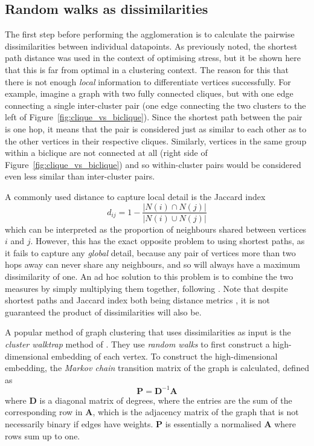 \subsection{Random walks as dissimilarities}
The first step before performing the agglomeration is to calculate the pairwise dissimilarities between individual datapoints. As previously noted, the shortest path distance was used in the context of optimising stress, but it be shown here that this is far from optimal in a clustering context.
The reason for this that there is not enough \emph{local} information to differentiate vertices successfully.
For example, imagine a graph with two fully connected cliques, but with one edge connecting a single inter-cluster pair (one edge connecting the two clusters to the left of Figure~\ref{fig:clique_vs_biclique}). Since the shortest path between the pair is one hop, it means that the pair is considered just as similar to each other as to the other vertices in their respective cliques.
Similarly, vertices in the same group within a biclique are not connected at all (right side of Figure~\ref{fig:clique_vs_biclique}) and so within-cluster pairs would be considered even less similar than inter-cluster pairs.

A commonly used distance to capture local detail is the Jaccard index
\begin{equation}
  d_{ij} = 1 - \frac{|N(i) \cap N(j)|}{|N(i) \cup N(j)|}
  \label{eq:jaccard}
\end{equation}
which can be interpreted as the proportion of neighbours shared between vertices $i$ and $j$. However, this has the exact opposite problem to using shortest paths, as it fails to capture any \emph{global} detail, because any pair of vertices more than two hops away can never share any neighbours, and so will always have a maximum dissimilarity of one.
An ad hoc solution to this problem is to combine the two measures by simply multiplying them together, following \citet{Zheng2018}. Note that despite shortest paths and Jaccard index both being distance metrics \citep{Clarkson2006}, it is not guaranteed the product of dissimilarities will also be.

A popular method of graph clustering that uses dissimilarities as input is the \emph{cluster walktrap} method of \citet{Pons2006}. They use \emph{random walks} to first construct a high-dimensional embedding of each vertex.
To construct the high-dimensional embedding, the \emph{Markov chain} transition matrix of the graph is calculated, defined as
\begin{equation}
  \mathbf{P} = \mathbf{D}^{-1} \mathbf{A}
\end{equation}
where $\mathbf{D}$ is a diagonal matrix of degrees, where the entries are the sum of the corresponding row in $\mathbf{A}$, which is the adjacency matrix of the graph that is not necessarily binary if edges have weights. $\mathbf{P}$ is essentially a normalised $\mathbf{A}$ where rows sum up to one.

